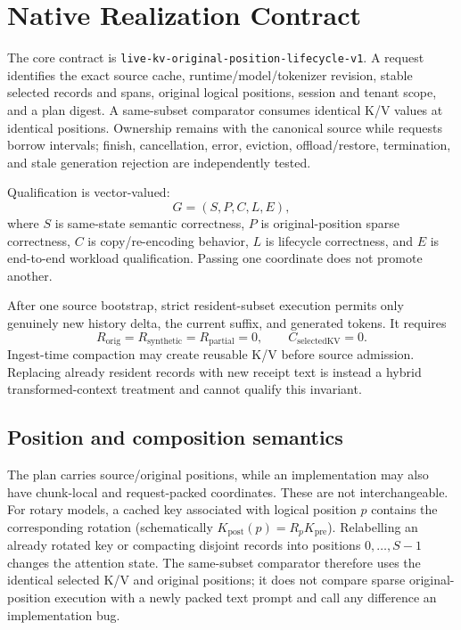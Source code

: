 \documentclass[11pt]{article}
\newcommand{\EngineContract}{\texttt{live-kv-original-\allowbreak position-\allowbreak lifecycle-v1}}
\begin{document}
\section{Native Realization Contract}

The core contract is \EngineContract{}.  A request identifies the exact source
cache, runtime/model/tokenizer revision, stable selected records and spans,
original logical positions, session and tenant scope, and a plan digest.  A
same-subset comparator consumes identical K/V values at identical positions.
Ownership remains with the canonical source while requests borrow intervals;
finish, cancellation, error, eviction, offload/restore, termination, and stale
generation rejection are independently tested.

Qualification is vector-valued:
\[
G=(S,P,C,L,E),
\]
where $S$ is same-state semantic correctness, $P$ is original-position sparse
correctness, $C$ is copy/re-encoding behavior, $L$ is lifecycle correctness,
and $E$ is end-to-end workload qualification.  Passing one coordinate does not
promote another.

After one source bootstrap, strict resident-subset execution permits only
genuinely new history delta, the current suffix, and generated tokens.  It
requires
\[
R_{\mathrm{orig}}=R_{\mathrm{synthetic}}=R_{\mathrm{partial}}=0,
\qquad C_{\mathrm{selectedKV}}=0.
\]
Ingest-time compaction may create reusable K/V before source admission.
Replacing already resident records with new receipt text is instead a hybrid
transformed-context treatment and cannot qualify this invariant.

\subsection{Position and composition semantics}

The plan carries source/original positions, while an implementation may also
have chunk-local and request-packed coordinates.  These are not interchangeable.
For rotary models, a cached key associated with logical position $p$ contains
the corresponding rotation (schematically $K_{\mathrm{post}}(p)=R_p
K_{\mathrm{pre}}$).  Relabelling an already rotated key or compacting disjoint
records into positions $0,\ldots,S-1$ changes the attention state.  The
same-subset comparator therefore uses the identical selected K/V and original
positions; it does not compare sparse original-position execution with a newly
packed text prompt and call any difference an implementation bug.
\end{document}
